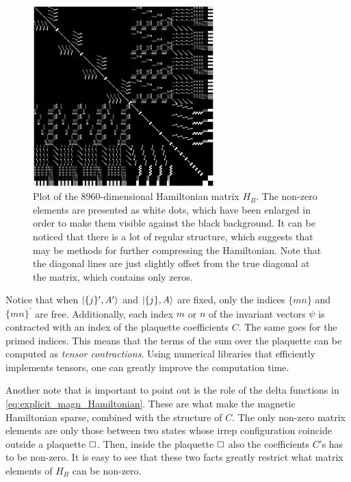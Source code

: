 \begin{figure}[t]
    \centering
    \includegraphics[width=7cm]{assets/graphs/magn_sparse.png}
    \caption[Non-zero elements of $H_B$]{%
        Plot of the $8960$-dimensional Hamiltonian matrix $H_B$.
        The non-zero elements are presented as white dots, which have been enlarged in order to make them visible against the black background.
        It can be noticed that there is a lot of regular structure, which suggests that may be methods for further compressing the Hamiltonian.
        Note that the diagonal lines are just slightly offset from the true diagonal at the matrix, which contains only zeros.
    }
    \label{fig:magn_sparse}
\end{figure}


Notice that when $\ket{ \{j\}^{\prime}, A^{\prime}}$ and $\ket{ \{j\}, A}$ are fixed, only the indices $ \{mn\} $ and $ \{mn\}^{\prime}$ are free.
Additionally, each index $m$ or $n$ of the invariant vectors $\psi$ is contracted with an index of the plaquette coefficients $C$.
The same goes for the primed indices.
This means that the terms of the sum over the plaquette can be computed as \emph{tensor contractions}.
Using numerical libraries that efficiently implements tensors, one can greatly improve the computation time.

Another note that is important to point out is the role of the delta functions in \eqref{eq:explicit_magn_Hamiltonian}.
These are what make the magnetic Hamiltonian sparse, combined with the structure of $C$.
The only non-zero matrix elements are only those between two states whose \ac{irrep} configuration coincide outside a plaquette $\square$.
Then, inside the plaquette $\square$ also the coefficients $C$'s has to be non-zero.
It is easy to see that these two facts greatly restrict what matrix elements of $H_B$ can be non-zero.



